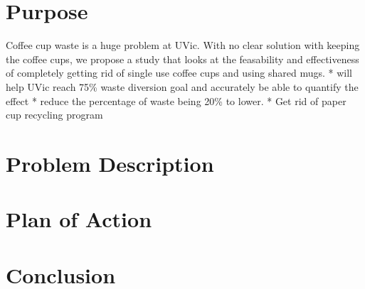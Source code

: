 \documentclass[letterpaper,11pt]{texMemo} %
\begin{document}
\maketitle %


\section {Purpose}
Coffee cup waste is a huge problem at UVic. With no clear solution with keeping the coffee cups, we propose a study that looks at the feasability and effectiveness of completely getting rid of single use coffee cups and using shared mugs.
* will help UVic reach 75\% waste diversion goal and accurately be able to quantify the effect
* reduce the percentage of waste being 20\% to lower.
* Get rid of paper cup recycling program
\section {Problem Description}

\section {Plan of Action}

\section {Conclusion}

\end{document}
